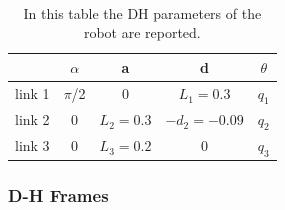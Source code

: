 \documentclass{article}
\begin{document}
\paragraph{}
\FloatBarrier
\begin{table}[!htbp]
\centering
\begin{tabular}{|c|cccc|}
\hline
& $\alpha$ & a & d & $\theta$\\
\hline
link 1 & $\pi$/2 & 0 & $L_1=0.3$ & $q_1$\\
link 2 & 0 & $L_2=0.3$ & $-d_2=-0.09$ & $q_2$\\
link 3 & 0 & $L_3=0.2$ & 0 & $q_3$\\
\hline
\end{tabular}
\caption{In this table the DH parameters of the robot are reported.}
\end{table}
\subsubsection*{D-H Frames}
\end{document}
